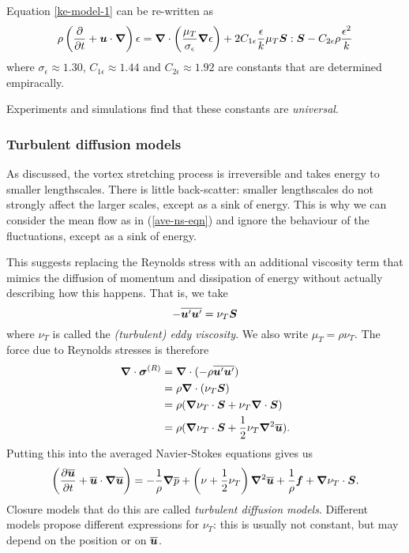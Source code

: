 Equation \ref{ke-model-1} can be re-written as 
\begin{equation}
    \rho\left(\frac{\partial}{\partial t} + \boldsymbol{u}\cdot\boldsymbol{\nabla}\right)\epsilon =
    \boldsymbol{\nabla}\cdot\left(\frac{\mu_T}{\sigma_\epsilon}\boldsymbol{\nabla}\epsilon\right)
    + 2 C_{1\epsilon} \frac{\epsilon}{k}\mu_T\boldsymbol{S}:\boldsymbol{S}
    - C_{2\epsilon}\rho\frac{\epsilon^2}{k}
\end{equation}
where $\sigma_\epsilon\approx1.30$, $C_{1\epsilon}\approx1.44$ and
$C_{2\epsilon}\approx1.92$ are constants that are determined empiracally.

Experiments and simulations find that these constants are \textit{universal}.

\subsubsection{Turbulent diffusion models}

As discussed, the vortex stretching process is irreversible and takes energy to
smaller lengthscales. There is little back-scatter: smaller lengthscales do not
strongly affect the larger scales, except as a sink of energy. This is why we
can consider the mean flow as in (\ref{ave-ns-eqn}) and ignore the behaviour of
the fluctuations, except as a sink of energy.

This suggests replacing the Reynolds stress with an additional viscosity term
that mimics the diffusion of momentum and dissipation of energy without actually
describing how this happens. That is, we take
\begin{equation}
    -\overline{\boldsymbol{u}' \boldsymbol{u}'} = \nu_T \boldsymbol{S}
\end{equation}
where $\nu_T$ is called the \textit{(turbulent) eddy viscosity}. We also write
$\mu_T = \rho\nu_T$. The force due to Reynolds stresses is therefore
\begin{align}
    \boldsymbol{\nabla}\cdot\boldsymbol{\sigma}^{(R)} &= \boldsymbol{\nabla}\cdot(-\rho\overline{\boldsymbol{u}'\boldsymbol{u}'})  \\
     &= \rho\boldsymbol{\nabla}\cdot(\nu_T\boldsymbol{S}) \\
     &= \rho (\boldsymbol{\nabla}\nu_T \cdot \boldsymbol{S} + \nu_T \boldsymbol{\nabla}\cdot\boldsymbol{S}) \\
     &= \rho (\boldsymbol{\nabla}\nu_T \cdot \boldsymbol{S} + \frac{1}{2} \nu_T \boldsymbol{\nabla}^2\overline{\boldsymbol{u}}).
\end{align}
Putting this into the averaged Navier-Stokes equations gives us
\begin{equation}
    \left(\frac{\partial\overline{\boldsymbol{u}}}{\partial t} +
    \overline{\boldsymbol{u}}\cdot\boldsymbol{\nabla}\overline{\boldsymbol{u}}\right)
    = -\frac{1}{\rho}\boldsymbol{\nabla}\overline{p} 
    + \left(\nu+\frac{1}{2}\nu_T\right)\boldsymbol{\nabla}^2\overline{\boldsymbol{u}} 
    + \frac{1}{\rho}\boldsymbol{f} 
    + \boldsymbol{\nabla}\nu_T \cdot \boldsymbol{S}.
    \label{ave-ns-eqn-td-model}
\end{equation}
Closure models that do this are called \textit{turbulent diffusion models}.
Different models propose different expressions for $\nu_T$: this is usually not 
constant, but may depend on the position or on $\overline{\boldsymbol{u}}$.

